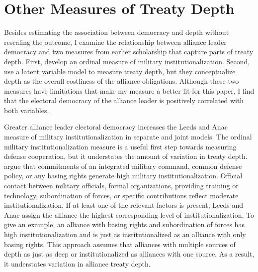 \documentclass[12pt]{article}
\begin{document}
\section{Other Measures of Treaty Depth}



Besides estimating the association between democracy and depth without rescaling the outcome, I examine the relationship between alliance leader democracy and two measures from earlier scholarship that capture parts of treaty depth. 
First, \citet{LeedsAnac2005} develop an ordinal measure of military institutionalization.
Second, \citet{BensonClinton2016} use a latent variable model to measure treaty depth, but they conceptualize depth as the overall costliness of the alliance obligations. 
Although these two measures have limitations that make my measure a better fit for this paper, I find that the electoral democracy of the alliance leader is positively correlated with both variables.


Greater alliance leader electoral democracy increases the Leeds and Anac measure of military institutionalization in separate and joint models.
The ordinal military institutionalization measure is a useful first step towards measuring defense cooperation, but it understates the amount of variation in treaty depth. 
\citet{LeedsAnac2005} argue that commitments of an integrated military command, common defense policy, or any basing rights generate high military institutionalization. 
Official contact between military officials, formal organizations, providing training or technology, subordination of forces, or specific contributions reflect moderate institutionalization. 
If at least one of the relevant factors is present, Leeds and Anac assign the alliance the highest corresponding level of institutionalization. 
To give an example, an alliance with basing rights and subordination of forces has high institutionalization and is just as institutionalized as an alliance with only basing rights. 
This approach assumes that alliances with multiple sources of depth as just as deep or institutionalized as alliances with one source.
As a result, it understates variation in alliance treaty depth.
\end{document}
